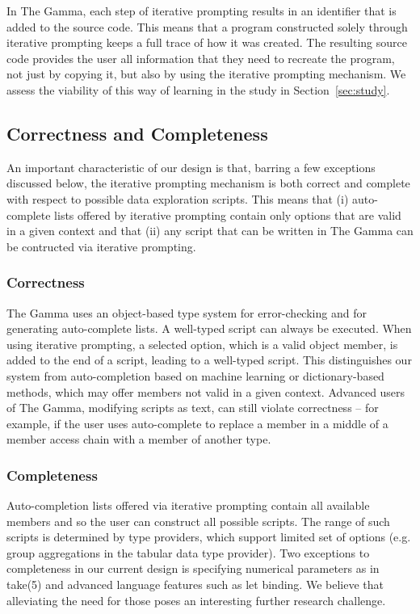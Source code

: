 \documentclass[manuscript,review,anonymous]{acmart}
\newcommand{\ikvd}[1]{{\fontfamily{zi4}\selectfont\small #1}}
\begin{document}
In The Gamma, each step of iterative prompting results in an identifier that is
added to the source code. This means that a program constructed solely through iterative prompting
keeps a full trace of how it was created. The resulting source code provides the user all
information that they need to recreate the program, not just by copying it, but also by using the
iterative prompting mechanism. We assess the viability of this way of learning in the study in
Section~\ref{sec:study}.

\subsection{Correctness and Completeness}
\label{sec:design-cc}

An important characteristic of our design is that, barring a few exceptions discussed below, the iterative
prompting mechanism is both correct and complete with respect to possible data exploration scripts.
This means that (i) auto-complete lists offered by iterative prompting contain
only options that are valid in a given context and that (ii) any script that can be written
in The Gamma can be contructed via iterative prompting.

\subsubsection*{Correctness} The Gamma uses an object-based type system for error-checking and for
generating auto-complete lists. A well-typed script can always be executed. When using iterative
prompting, a selected option, which is a valid object member, is added to the end of a script,
leading to a well-typed script. This distinguishes our system from auto-completion based on machine
learning or dictionary-based methods, which may offer members not valid in a given context. Advanced
users of The Gamma, modifying scripts as text, can still violate correctness -- for example, if the
user uses auto-complete to replace a member in a middle of a member access chain with a member of another type.

\subsubsection*{Completeness} Auto-completion lists offered via iterative prompting contain
all available members and so the user can construct all possible scripts. The range of such scripts
is determined by type providers, which support limited set of options (e.g. group aggregations in
the tabular data type provider). Two exceptions to completeness in our current design is specifying
numerical parameters as in \ikvd{take(5)} and advanced language features such as let binding.
We believe that alleviating the need for those poses an interesting further research challenge.
\end{document}
